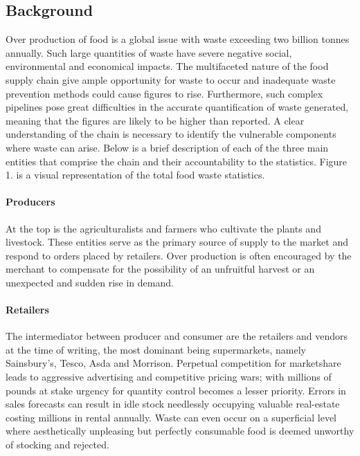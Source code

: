 \documentclass[a4paper, 11pt]{article}
\begin{document}
\subsection{Background}
Over production of food is a global issue with waste exceeding two billion tonnes annually\cite{waste}. Such large quantities of waste have severe negative social, environmental and economical impacts. The multifaceted nature of the food supply chain give ample opportunity for waste to occur and inadequate waste prevention methods could cause figures to rise.\cite{FoodWaste} Furthermore, such complex pipelines pose great difficulties in the accurate quantification of waste generated, meaning that the figures are likely to be higher than reported.\cite{waste} A clear understanding of the chain is necessary to identify the vulnerable components where waste can arise. Below is a brief description of each of the three main entities that comprise the chain and their accountability to the statistics. Figure 1. is a visual representation of the total food waste statistics.\cite{statistic}

\paragraph{Producers}At the top is the agriculturalists and farmers who cultivate the plants and livestock. These entities serve as the primary source of supply to the market and respond to orders placed by retailers. Over production is often encouraged by the merchant to compensate for the possibility of an unfruitful harvest or an unexpected and sudden rise in demand.\cite{waste} 

\paragraph{Retailers}The intermediator between producer and consumer are the retailers and vendors at the time of writing, the most dominant being supermarkets, namely Sainsbury's, Tesco, Asda and Morrison. Perpetual competition for marketshare leads to aggressive advertising and competitive pricing wars; with millions of pounds at stake urgency for quantity control becomes a lesser priority. Errors in sales forecasts can result in idle stock needlessly occupying valuable real-estate costing millions in rental annually. Waste can even occur on a superficial level where aesthetically unpleasing but perfectly consumable food is deemed unworthy of stocking and rejected.\cite{FoodWaste} 
\end{document}
